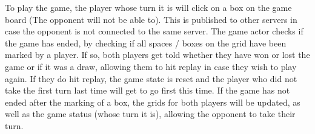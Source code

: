 \documentclass[]{interim}
\begin{document}
To play the game, the player whose turn it is will click on a box on the game board
(The opponent will not be able to). This is published to other servers in case the
opponent is not connected to the same server. The game actor checks if the game
has ended, by checking if all spaces / boxes on the grid have been marked by a player.
If so, both players get told whether they have won or lost the game or if it was a draw,
allowing them to hit replay in case they wish to play again. If they do hit replay,
the game state is reset and the player who did not take the first turn last time
will get to go first this time. If the game has not ended after the marking of a box,
the grids for both players will be updated, as well as the game status (whose turn it is),
allowing the opponent to take their turn.

\newpage
\end{document}
